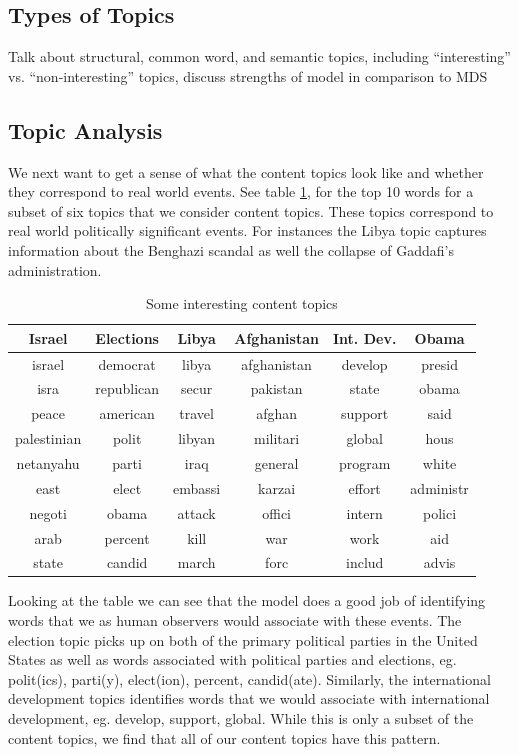 \documentclass[12pt]{article}
\theoremstyle{definition}
\theoremstyle{algodesc}
\begin{document}
\subsection{Types of Topics}
Talk about structural, common word, and semantic topics, including ``interesting'' vs. ``non-interesting'' topics, discuss strengths of model in comparison to MDS


\subsection{Topic Analysis}
We next want to get a sense of what the content topics look like and whether they correspond to real world events.  See table \ref{tab:content_topics}, for the top 10 words for a subset of six topics that we consider content topics.  These topics correspond to real world politically significant events.  For instances the Libya topic captures information about the Benghazi scandal as well the collapse of Gaddafi's administration.

\begin{table}[h] \centering
\begin{tabular}{cccccc}
  \toprule
  Israel & Elections & Libya & Afghanistan & Int. Dev. & Obama \\
  \midrule
  israel & democrat & libya & afghanistan & develop & presid \\
  isra & republican & secur & pakistan & state & obama \\
  peace & american & travel & afghan & support & said \\
  palestinian & polit & libyan & militari & global & hous \\
  netanyahu & parti & iraq & general & program & white \\
  east & elect & embassi & karzai & effort & administr \\
  negoti & obama & attack & offici & intern & polici \\
  arab & percent & kill & war & work & aid \\
  state & candid & march & forc & includ & advis \\
  \bottomrule
\end{tabular}
\caption{Some interesting content topics}
\label{tab:content_topics}
\end{table}

Looking at the table we can see that the model does a good job of identifying words that we as human observers would associate with these events.  The election topic picks up on both of the primary political parties in the United States as well as words associated with political parties and elections, eg. polit(ics), parti(y), elect(ion), percent, candid(ate).  Similarly, the international development topics identifies words that we would associate with international development, eg. develop, support, global.  While this is only a subset of the content topics, we find that all of our content topics have this pattern.
\end{document}
